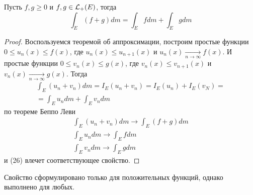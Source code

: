 \documentclass[main]{subfiles}
\begin{document}
\begin{corollary}
    Пусть $f, g \ge 0$ и $f,g \in \mathcal{L}_+(E)$, тогда
    \[\int_E (f+g) dm = \int_E fdm + \int_E gdm\]
\end{corollary}
\begin{proof}
    Воспользуемся теоремой об аппроксимации, построим простые функции $0 \le u_n(x) \le f(x)$, где $u_n(x) \le u_{n+1}(x)$ и $u_n(x) \xrightarrow[n \to \infty]{} f(x)$.
    И простые функции $0 \le v_n(x) \le g(x)$, где $v_n(x) \le v_{n+1}(x)$ и $v_n(x) \xrightarrow[n \to \infty]{} g(x)$.
    Тогда
    \begin{multline*}
        \int_E (u_n + v_n) dm = I_E(u_n + v_n) = I_E(u_n) + I_E(v_N) =\\
        = \int_E u_n dm + \int_E v_n dm \tag{26}
    \end{multline*}
    по теореме Беппо Леви
    \begin{gather*}
        \int_E (u_n + v_n) dm \to \int_E (f + g) dm \\
        \int_E u_n dm \to \int_E f dm \\
        \int_E v_n dm \to \int_E g dm
    \end{gather*}
    и (26) влечет соответствующее свойство.
\end{proof}
\begin{remark}
    Свойство сформулировано только для положительных функций, однако выполнено для любых.
\end{remark}
\end{document}
